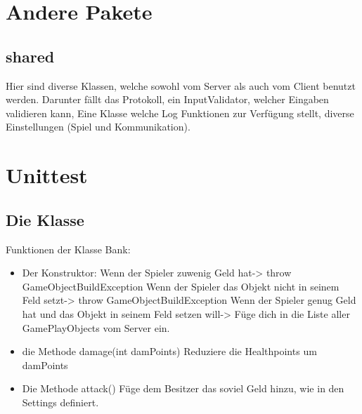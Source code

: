 \documentclass[ngerman, 12pt, pdftex]{scrartcl}[2006/07/30]
\begin{document}
\section{Andere Pakete}
\subsection{shared}
Hier sind diverse Klassen, welche sowohl vom Server als auch vom Client benutzt werden.
Darunter fällt das Protokoll, ein InputValidator, welcher Eingaben validieren kann, Eine Klasse welche Log Funktionen zur Verfügung stellt,
diverse Einstellungen (Spiel und Kommunikation).

\section{Unittest}
\subsection{Die Klasse}
Funktionen der Klasse Bank:
\begin{itemize}
\item Der Konstruktor: 
\subitem Wenn der Spieler zuwenig Geld hat-> throw GameObjectBuildException
\subitem Wenn der Spieler das Objekt nicht in seinem Feld setzt-> throw GameObjectBuildException
\subitem Wenn der Spieler genug Geld hat und das Objekt in seinem Feld setzen will-> F\"{u}ge dich in die Liste aller GamePlayObjects vom Server ein.
\item die Methode damage(int damPoints)
\subitem Reduziere die Healthpoints um damPoints
\item Die Methode attack()
\subitem F\"{u}ge dem Besitzer das soviel Geld hinzu, wie in den Settings definiert.
\end{itemize}
\end{document}

